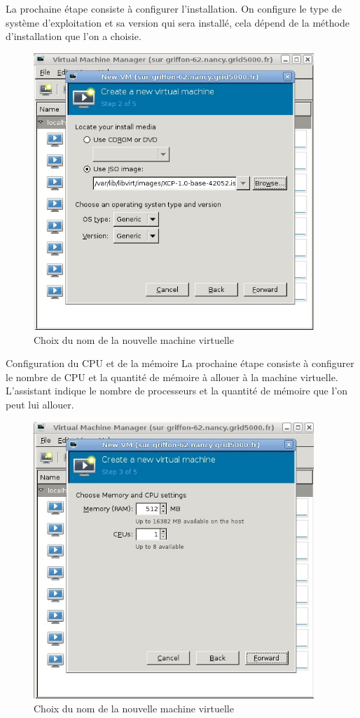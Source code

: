 La prochaine étape consiste à configurer l'installation.
On configure le type de système d'exploitation et sa version qui sera installé, cela dépend de la méthode d'installation que l'on a choisie.
\begin{figure}
\begin{center}
\includegraphics[width=300pt]{images/iso.jpg}
\end{center}
\caption{Choix du nom de la nouvelle machine virtuelle}
\end{figure}



Configuration du CPU et de la mémoire
La prochaine étape consiste à configurer le nombre de CPU et la quantité de mémoire à allouer à la machine virtuelle. L'assistant indique le nombre de processeurs et la quantité de mémoire que l'on peut lui allouer.
\begin{figure}
\begin{center}
\includegraphics[width=300pt]{images/cpu.jpg}
\end{center}
\caption{Choix du nom de la nouvelle machine virtuelle}
\end{figure}


